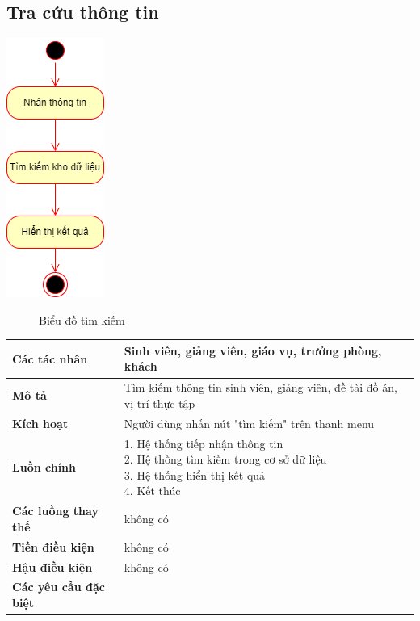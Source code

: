 \subsection{Tra cứu thông tin}
  \begin{center}
    \includegraphics[width=.3\textwidth]{../drawio/activity/search_info.png}
    \begin{figure}[h]
      \centering
      \caption{Biểu đồ tìm kiếm}
    \end{figure}
  \end{center}
	\begin{tabular}{|l|l|}
		\hline
		\textbf{Các tác nhân}       & Sinh viên, giảng viên, giáo vụ, trưởng phòng, khách \\
		\hline
		\textbf{Mô tả}              & Tìm kiếm thông tin sinh viên, giảng viên, đề tài đồ án, vị trí thực tập                                           \\
		\hline
		\textbf{Kích hoạt}          & Người dùng nhấn nút "tìm kiếm" trên thanh menu \\
		\hline
		\textbf{Luồn chính}         & \makecell[l]{1. Hệ thống tiếp nhận thông tin \\ 2. Hệ thống tìm kiếm trong cơ sở dữ liệu \\ 3. Hệ thống hiển thị kết quả \\ 4. Kết thúc} \\
		\hline
		\textbf{Các luồng thay thế} & không có                                                   \\
		\hline
		\textbf{Tiền điều kiện}     & không có                                                   \\
		\hline
		\textbf{Hậu điều kiện}      & không có                                                    \\
		\hline
    \textbf{Các yêu cầu đặc biệt} & \\
    \hline
	\end{tabular}
  